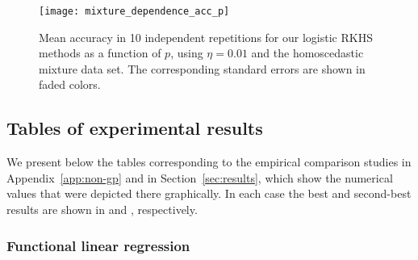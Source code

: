\begin{figure}[ht!]
    \centering
    \texttt{[image: mixture\_dependence\_acc\_p]}
    \caption{Mean accuracy in 10 independent repetitions for our logistic RKHS methods as a function of \(p\), using \(\eta=0.01\) and the homoscedastic mixture data set. The corresponding standard errors are shown in faded colors.}\label{fig:dependence_acc_p}
\end{figure}


\subsection{Tables of experimental results}\label{app:tables}

We present below the tables corresponding to the empirical comparison studies in Appendix~\ref{app:non-gp} and in Section~\ref{sec:results}, which show the numerical values that were depicted there graphically. In each case the best and second-best results are shown in  and , respectively.

\subsubsection*{Functional linear regression}

